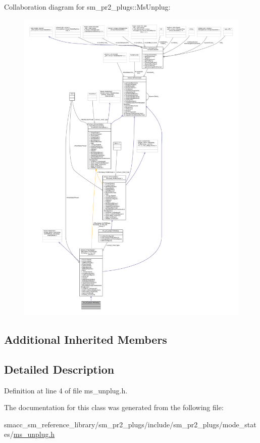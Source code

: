 Collaboration diagram for sm\+\_\+pr2\+\_\+plugs\+:\+:Ms\+Unplug\+:
\nopagebreak
\begin{figure}[H]
\begin{center}
\leavevmode
\includegraphics[width=350pt]{classsm__pr2__plugs_1_1MsUnplug__coll__graph}
\end{center}
\end{figure}
\subsection*{Additional Inherited Members}


\subsection{Detailed Description}


Definition at line 4 of file ms\+\_\+unplug.\+h.



The documentation for this class was generated from the following file\+:\begin{DoxyCompactItemize}
\item 
smacc\+\_\+sm\+\_\+reference\+\_\+library/sm\+\_\+pr2\+\_\+plugs/include/sm\+\_\+pr2\+\_\+plugs/mode\+\_\+states/\hyperlink{ms__unplug_8h}{ms\+\_\+unplug.\+h}\end{DoxyCompactItemize}
